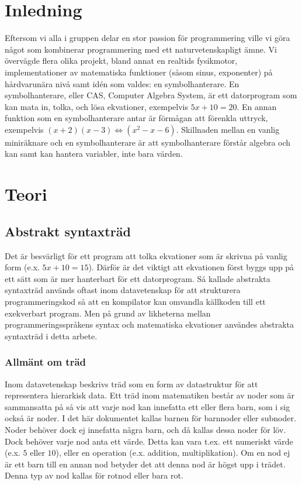 \documentclass[12pt,a4paper]{article}
\begin{document}
\section{Inledning}
Eftersom vi alla i gruppen delar en stor passion för programmering ville vi göra något som kombinerar programmering med ett naturvetenskapligt ämne. Vi övervägde flera olika projekt, bland annat en realtids fysikmotor, implementationer av matematiska funktioner (såsom sinus, exponenter) på hårdvarunära nivå samt idén som valdes: en symbolhanterare. En symbolhanterare, eller CAS, Computer Algebra System, är ett datorprogram som kan mata in, tolka, och lösa ekvationer, exempelvis \(5x + 10 = 20\). En annan funktion som en symbolhanterare antar är förmågan att förenkla uttryck, exempelvis \((x + 2)(x - 3) \Leftrightarrow (x^{2} - x - 6)\). Skillnaden mellan en vanlig miniräknare och en symbolhanterare är att symbolhanterare förstår algebra och kan samt kan hantera variabler, inte bara värden.
\section{Teori}
\subsection{Abstrakt syntaxträd}
Det är besvärligt för ett program att tolka ekvationer som är skrivna på vanlig form (e.x. \(5x + 10 = 15\)). Därför är det viktigt att ekvationen först byggs upp på ett sätt som är mer hanterbart för ett datorprogram. Så kallade abstrakta syntaxträd används oftast inom datavetenskap för att strukturera programmeringskod så att en kompilator kan omvandla källkoden till ett exekverbart program. Men på grund av likheterna mellan programmeringsspråkens syntax och matematiska ekvationer användes abstrakta syntaxträd i detta arbete.
\subsubsection{Allmänt om träd}
Inom datavetenskap beskrivs träd som en form av datastruktur för att representera hierarkisk data. Ett träd inom matematiken består av noder som är sammansatta på så vis att varje nod kan innefatta ett eller flera barn, som i sig också är noder. I det här dokumentet kallas barnen för barnnoder eller subnoder. Noder behöver dock ej innefatta några barn, och då kallas dessa noder för löv. Dock behöver varje nod anta ett värde. Detta kan vara t.ex. ett numeriskt värde (e.x. \(5\) eller \(10\)), eller en operation (e.x. addition, multiplikation). Om en nod ej är ett barn till en annan nod betyder det att denna nod är högst upp i trädet. Denna typ av nod kallas för rotnod eller bara rot.
\end{document}
